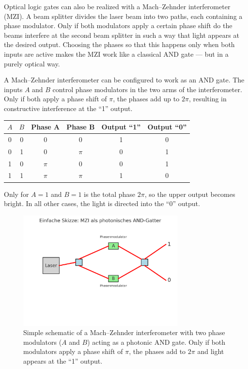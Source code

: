 Optical logic gates can also be realized with a Mach–Zehnder interferometer (MZI). 
A beam splitter divides the laser beam into two paths, each containing a phase modulator. 
Only if both modulators apply a certain phase shift do the beams interfere at the second beam splitter in such a way that light appears at the desired output. 
Choosing the phases so that this happens only when both inputs are active makes the MZI work like a classical \textsc{AND} gate — but in a purely optical way. 
\vspace{1em}
\begin{tcolorbox}[didaktikbox, title=Photonic AND Gate in a Mach--Zehnder Interferometer, label={box:mzi_and}]
	\small
	A Mach--Zehnder interferometer can be configured to work as an \textsc{AND} gate. 
	The inputs \(A\) and \(B\) control phase modulators in the two arms of the interferometer. 
	Only if both apply a phase shift of \(\pi\), the phases add up to \(2\pi\), resulting in constructive interference at the “1” output.
	
\begin{center}
	\begin{tabular}{c c c c c c}
		\hline
		\(A\) & \(B\) & Phase A & Phase B & Output “1” & Output “0” \\
		\hline
		0 & 0 & \(0\) & \(0\) & 1 & 0 \\
		0 & 1 & \(0\) & \(\pi\) & 0 & 1 \\
		1 & 0 & \(\pi\) & \(0\) & 0 & 1 \\
		1 & 1 & \(\pi\) & \(\pi\) & 1 & 0 \\
		\hline
	\end{tabular}
\end{center}

	Only for \(A=1\) and \(B=1\) is the total phase \(2\pi\), so the upper output becomes bright. 
	In all other cases, the light is directed into the “0” output.
\end{tcolorbox}
\newpage
\noindent
\begin{figure}[H]
	\centering
	\includegraphics[width=0.75\textwidth]{bilder/mzi_and_simple.png}
	\caption{Simple schematic of a Mach--Zehnder interferometer with two phase modulators (\(A\) and \(B\)) acting as a photonic \textsc{AND} gate. Only if both modulators apply a phase shift of \(\pi\), the phases add to \(2\pi\) and light appears at the “1” output.}
	\label{fig:mzi_and_simple}
\end{figure}

